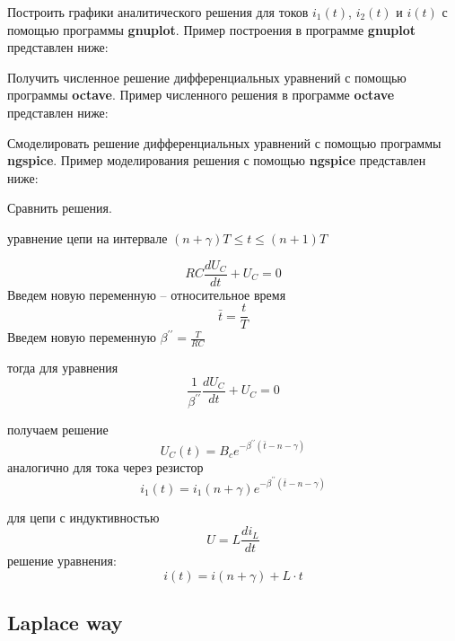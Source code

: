\documentclass[a4paper,12pt]{article}
\begin{document}


Построить графики аналитического решения для токов $i_1(t)$, $i_2(t)$ и $i(t)$ с помощью программы {\bf gnuplot}. Пример построения в программе {\bf gnuplot}
представлен ниже:



Получить численное решение дифференциальных уравнений с помощью программы {\bf octave}. Пример численного решения в программе {\bf octave} представлен ниже:



Смоделировать решение дифференциальных уравнений с помощью программы {\bf ngspice}. Пример моделирования решения с помощью {\bf ngspice} представлен ниже:



Сравнить решения.


уравнение цепи на интервале $(n+\gamma)T \le t \le (n+1)T$

$$
RC \frac{d U_C}{dt} + U_C = 0
$$
Введем новую переменную -- относительное время
$$
\bar{t} = \frac{t}{T}
$$
Введем новую переменную $\beta^{\prime\prime} = \frac{T}{RC}$

тогда для уравнения
$$
\frac{1}{\beta^{\prime\prime}}\frac{dU_C}{dt} + U_C = 0
$$

получаем решение
$$
U_C(t) = B_c e^{-\beta^{\prime\prime}(\bar{t}-n-\gamma)}
$$
аналогично для тока через резистор
$$
i_1(t) = i_1(n+\gamma) e^{-\beta^{\prime\prime}(\bar{t}-n-\gamma)}
$$


для цепи с индуктивностью 
$$
U = L\frac{d i_L}{dt} 
$$
решение уравнения:
$$
i(t) = i(n+\gamma) + L\cdot t
$$


\subsection{Laplace way}
\end{document}
